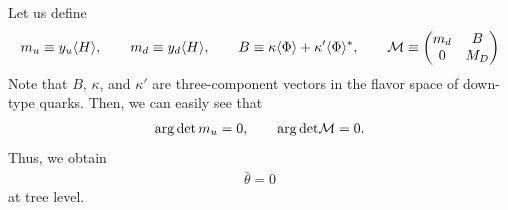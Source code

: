 \documentclass[11pt,a4paper]{article}
\begin{document}
Let us define
\begin{align}
    m_u \equiv y_u \langle H \rangle, \qquad
    m_d \equiv y_d \langle H \rangle, \qquad
    B \equiv \kappa \langle\Phi\rangle + \kappa' \langle\Phi\rangle^*, \qquad
    {\cal M} \equiv \mqty(m_{d} & B \\ 0 & M_D  ) \label{eq:mass matrix typeD}
\end{align}
Note that $B$, $\kappa$, and $\kappa'$ are three-component vectors in the flavor space of down-type quarks.
Then, we can easily see that
\begin{align}
    \arg\det m_u = 0, \qquad
    \arg{\det}{\cal M} = 0.
\end{align}
Thus, we obtain 
\begin{align}
    \bar\theta = 0
\end{align}
at tree level.
\end{document}

